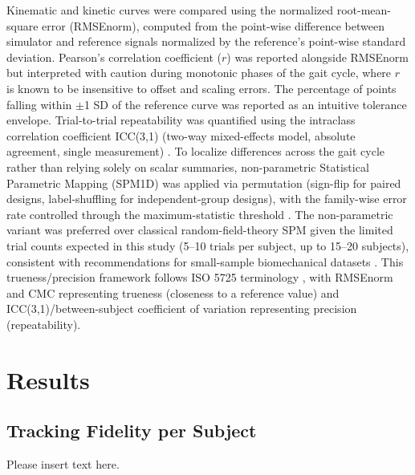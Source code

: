 \documentclass[journal,twocolumn,letterpaper]{IEEEJERM}
\begin{document}
Kinematic and kinetic curves were compared using the normalized
root-mean-square error (RMSEnorm), computed from the point-wise
difference between simulator and reference signals normalized by the
reference's point-wise standard deviation. Pearson's correlation
coefficient ($r$) was reported alongside RMSEnorm but interpreted with
caution during monotonic phases of the gait cycle, where $r$ is known to
be insensitive to offset and scaling errors. The percentage of points
falling within $\pm$1 SD of the reference curve was reported as an
intuitive tolerance envelope. Trial-to-trial repeatability was
quantified using the intraclass correlation coefficient ICC(3,1)
(two-way mixed-effects model, absolute agreement, single measurement)
\cite{KooLi2016}. To localize differences across the gait cycle rather
than relying solely on scalar summaries, non-parametric Statistical
Parametric Mapping (SPM1D) was applied via permutation (sign-flip for
paired designs, label-shuffling for independent-group designs), with the
family-wise error rate controlled through the maximum-statistic
threshold \cite{NicholsHolmes2002}. The non-parametric variant was
preferred over classical random-field-theory SPM given the limited
trial counts expected in this study (5--10 trials per subject, up to
15--20 subjects), consistent with recommendations for small-sample
biomechanical datasets \cite{Pataky2015}. This trueness/precision
framework follows ISO 5725 terminology \cite{ISO5725}, with RMSEnorm and
CMC representing trueness (closeness to a reference value) and
ICC(3,1)/between-subject coefficient of variation representing precision
(repeatability).

\section{Results}

\subsection*{Tracking Fidelity per Subject}
Please insert text here.
\end{document}
